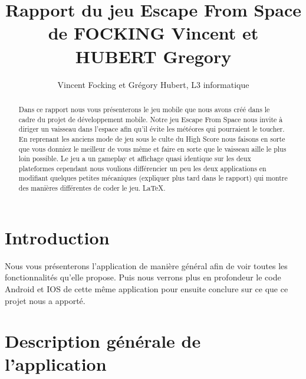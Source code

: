 \documentclass{article}
\title{Rapport du jeu Escape From Space de FOCKING Vincent et HUBERT Gregory}
\author{Vincent Focking et Grégory Hubert, L3 informatique}
\begin{document}
\maketitle


\begin{abstract}
  Dans ce rapport nous vous présenterons le jeu mobile que nous avons créé dans le cadre du projet de développement mobile. Notre jeu Escape From Space nous invite à diriger un vaisseau dans l'espace afin qu'il évite les météores qui pourraient le toucher. En reprenant les anciens mode de jeu sous le culte du High Score nous faisons en sorte que vous donniez le meilleur de vous même  et faire en sorte que le vaisseau aille le plus loin possible. Le jeu a un gameplay et affichage quasi identique sur les deux plateformes cependant nous voulions différencier un peu les deux applications en modifiant quelques petites mécaniques (expliquer plus tard dans le rapport) qui montre des manières différentes de coder le jeu. \LaTeX.
\end{abstract}


\section{Introduction}

Nous vous présenterons l'application de manière général afin de voir toutes les fonctionnalités qu'elle propose. 
Puis nous verrons plus en profondeur le code Android et IOS de cette même application pour ensuite conclure sur ce que ce projet nous a apporté.


\section{Description générale de l'application}
\end{document}

